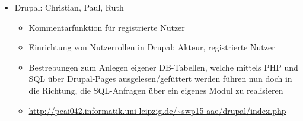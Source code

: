 \documentclass{swp}
\begin{document}
\\\\\\\\\\

\begin{itemize} 
\item Drupal: Christian, Paul, Ruth
\begin{itemize}
\item Kommentarfunktion f\"ur registrierte Nutzer
\item Einrichtung von Nutzerrollen in Drupal: Akteur, registrierte Nutzer
\item Bestrebungen zum Anlegen eigener DB-Tabellen, welche mittels PHP und SQL \"uber Drupal-Pages ausgelesen/gef\"uttert werden f\"uhren nun doch in die Richtung, die SQL-Anfragen \"uber ein eigenes Modul zu realisieren
\item \url{http://pcai042.informatik.uni-leipzig.de/~swp15-aae/drupal/index.php}
\end{itemize}
\end{itemize}
\end{document}
